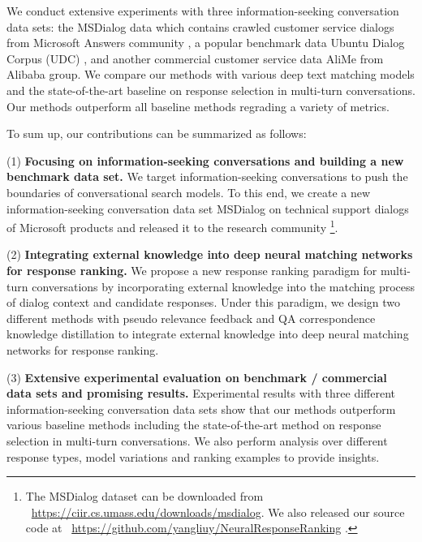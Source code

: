 We conduct extensive experiments with three information-seeking conversation data sets: the MSDialog data which contains crawled customer service dialogs from Microsoft Answers community , a popular benchmark data Ubuntu Dialog Corpus (UDC) \cite{DBLP:journals/corr/LowePSP15}, and another commercial customer service data AliMe from Alibaba group. We compare our methods with various deep text matching models and the state-of-the-art baseline on response selection in multi-turn conversations. Our methods outperform all baseline methods regrading a variety of metrics. %

To sum up, our contributions can be summarized as follows:

 (1) \textbf{Focusing on information-seeking conversations and building a new benchmark data set.} We target information-seeking conversations to push the boundaries of conversational search models. To this end, we create a new information-seeking conversation data set MSDialog on technical support dialogs of Microsoft products and released it to the research community \footnote{The MSDialog dataset can be downloaded from ~\url{https://ciir.cs.umass.edu/downloads/msdialog}.  We also released our source code at ~\url{https://github.com/yangliuy/NeuralResponseRanking} .}.

 (2) \textbf{Integrating external knowledge into deep neural matching networks for response ranking.}  We propose a new response ranking paradigm for multi-turn conversations by incorporating external knowledge into the matching process of dialog context and candidate responses. Under this paradigm, we design two different methods with pseudo relevance feedback and QA correspondence knowledge distillation to integrate external knowledge into deep neural matching networks for response ranking.
	
(3) \textbf{Extensive experimental evaluation on benchmark / commercial data sets and promising results.} Experimental results with three different information-seeking conversation data sets show that our methods outperform various baseline methods including the state-of-the-art method on response selection in multi-turn conversations. We also perform analysis over different response types, model variations and ranking examples to provide insights.


